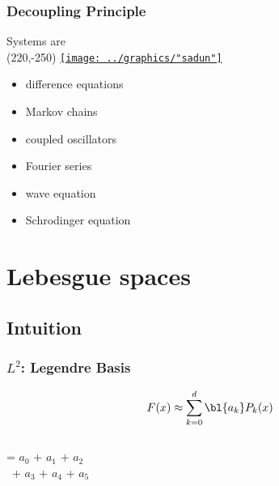 \documentclass[handout]{beamer}
\begin{document}
\begin{frame}      %
\frametitle{Decoupling Principle}
   Systems are  \\
   \Put(220,-250) {\href{http://www.ams.org/bookstore-getitem/item=MBK-50}{\texttt{[image: ../graphics/"sadun"]}}}
    \pause
\begin{itemize}
  \item  difference equations
  \item  Markov chains
  \item  coupled oscillators
  \item  Fourier series
  \item  wave equation
  \item  Schrodinger equation
\end{itemize}
  \twodots
\end{frame}

\section{Lebesgue spaces}


\subsection{Intuition}

\begin{frame}      %
\frametitle{$L^{2}$: Legendre Basis}
  $$F(x) \approx \sum_{k=0}^{d} \bl{a_{k}}P_{k}(x)$$\\[7pt]	
   = 
  $a_{0}$ \!\!\!  +
  $a_{1}$ \!\!\!  +
  $a_{2}$ \!\!\!  \\[7pt]
  \qquad \qquad \quad \ +
  $a_{3}$ \!\!\!  +
  $a_{4}$ \!\!\!  +
  $a_{5}$ \!\!\!  
\end{frame}
\end{document}
